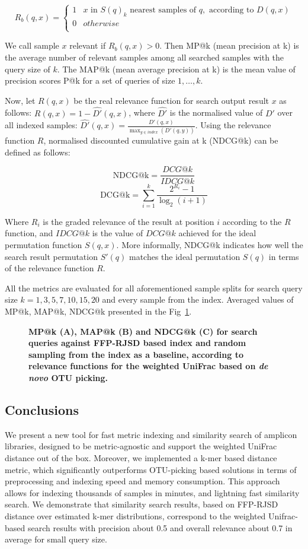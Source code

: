 \documentclass[10pt,letterpaper]{article}
\begin{document}
\[ R_b(q, x)  =
  \begin{cases}
    1  & x \text{ in } S(q)_k \text{ nearest samples of } q, \text{ according to } D(q, x)\\
    0  &  otherwise \\
  \end{cases}
\] 

We call sample $x$ relevant if $R_b(q, x) > 0$. Then MP@k (mean precision at k) is the average number of relevant samples among all searched samples with the query size of $k$. 
The MAP@k (mean average precision at k) is the mean value of precision scores P@k for a set of queries of size $1, \dots, k$.

Now, let $R(q, x)$ be the real relevance function for search output result $x$ as follows:
$R(q, x) = 1 - \hat{D'}(q, x)$, where $\hat{D'}$ 
is the normalised value of $D'$ over all indexed samples: $\hat{D'}(q, x) = \frac{D'(q, x)} {\displaystyle\max_{y \in index} (D'(q, y)) }$.
Using the relevance function $R$, normalised discounted cumulative gain at k (NDCG@k) can be defined as follows:

$$\mathrm{NDCG@k} = \frac{DCG@k}{IDCG@k}$$
$${\mathrm{DCG@k} = \sum_{i=1}^{k} \frac{2^{R_i} - 1} {\log_{2}(i + 1)} }$$

Where $\displaystyle R_{i}$ is the graded relevance of the result at position $\displaystyle i$ according to the $R$ function,
and $IDCG@k$ is the value of $DCG@k$ achieved for the ideal permutation function $S(q, x)$.
More informally, NDCG@k indicates how well the search result permutation $S'(q)$ matches the ideal permutation $S(q)$ in terms of the relevance function $R$.

All the metrics are evaluated for all aforementioned sample splits for search query size $k = {1, 3, 5, 7, 10, 15, 20}$ and every sample from the index. Averaged values of MP@k, MAP@k, NDCG@k presented in the Fig~\ref{fig5}.


\begin{figure}[!h]
\caption{{\bf MP@k (A), MAP@k (B) and NDCG@k (C) for search queries against FFP-RJSD based index and random sampling from the index as a baseline, 
according to relevance functions for the weighted UniFrac based on \textit{de novo} OTU picking.}}
\label{fig5}
\end{figure}


\subsection*{Conclusions}
We present a new tool for fast metric indexing and similarity search of amplicon libraries, designed to be metric-agnostic and support the weighted UniFrac distance out of the box.
Moreover, we implemented a k-mer based distance metric, which significantly outperforms OTU-picking based solutions in terms of preprocessing and indexing speed and memory consumption.
This approach allows for indexing thousands of samples in minutes, and lightning fast similarity search. 
We demonstrate that similarity search results, based on FFP-RJSD distance over estimated k-mer distributions, correspond to the weighted Unifrac-based search results with precision about 0.5 and overall relevance about 0.7 in average for small query size.



\end{document}
